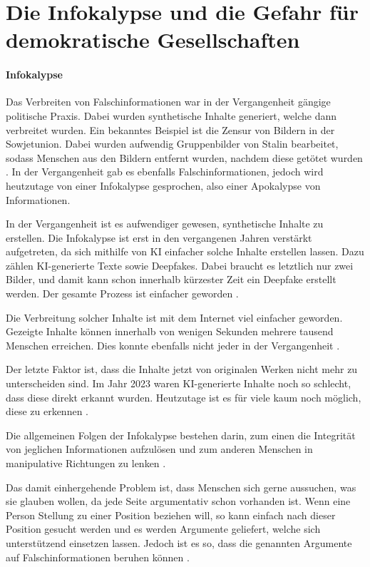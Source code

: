 \documentclass[11pt]{article}
\begin{document}
\section{Die Infokalypse und die Gefahr für demokratische Gesellschaften}

\paragraph{Infokalypse}

Das Verbreiten von Falschinformationen war in der Vergangenheit gängige politische Praxis. Dabei wurden synthetische Inhalte generiert, welche dann verbreitet wurden. Ein bekanntes Beispiel ist die Zensur von Bildern in der Sowjetunion. Dabei wurden aufwendig Gruppenbilder von Stalin bearbeitet, sodass Menschen aus den Bildern entfernt wurden, nachdem diese getötet wurden \cite{noauthor_censorship_2026}. In der Vergangenheit gab es ebenfalls Falschinformationen, jedoch wird heutzutage von einer Infokalypse gesprochen, also einer Apokalypse von Informationen.
 
In der Vergangenheit ist es aufwendiger gewesen, synthetische Inhalte zu erstellen. Die Infokalypse ist erst in den vergangenen Jahren verstärkt aufgetreten, da sich mithilfe von KI einfacher solche Inhalte erstellen lassen. Dazu zählen KI-generierte Texte sowie Deepfakes. Dabei braucht es letztlich nur zwei Bilder, und damit kann schon innerhalb kürzester Zeit ein Deepfake erstellt werden. Der gesamte Prozess ist einfacher geworden \cite{info}.

Die Verbreitung solcher Inhalte ist mit dem Internet viel einfacher geworden. Gezeigte Inhalte können innerhalb von wenigen Sekunden mehrere tausend Menschen erreichen. Dies konnte ebenfalls nicht jeder in der Vergangenheit \cite{info}.

Der letzte Faktor ist, dass die Inhalte jetzt von originalen Werken nicht mehr zu unterscheiden sind. Im Jahr 2023 waren KI-generierte Inhalte noch so schlecht, dass diese direkt erkannt wurden. Heutzutage ist es für viele kaum noch möglich, diese zu erkennen \cite{info}. 

Die allgemeinen Folgen der Infokalypse bestehen darin, zum einen die Integrität von jeglichen Informationen aufzulösen und zum anderen Menschen in manipulative Richtungen zu lenken \cite{info}.

Das damit einhergehende Problem ist, dass Menschen sich gerne aussuchen, was sie glauben wollen, da jede Seite argumentativ schon vorhanden ist. Wenn eine Person Stellung zu einer Position beziehen will, so kann einfach nach dieser Position gesucht werden und es werden Argumente geliefert, welche sich unterstützend einsetzen lassen. Jedoch ist es so, dass die genannten Argumente auf Falschinformationen beruhen können \cite{info}.  
\end{document}
